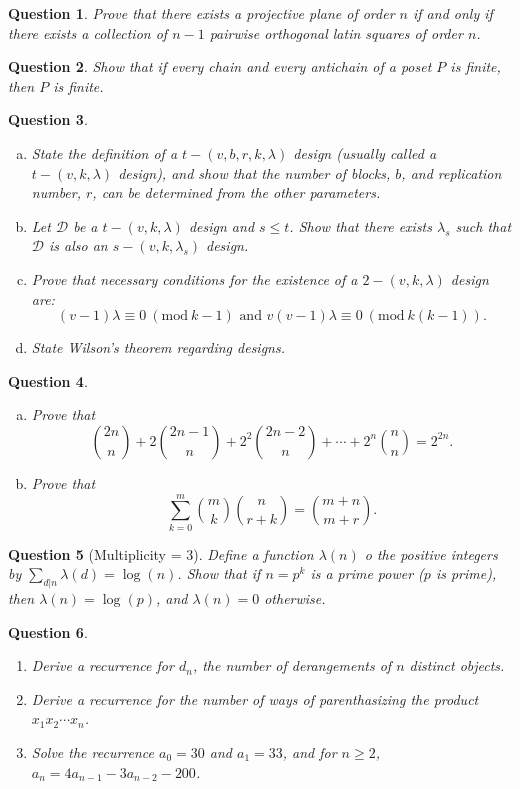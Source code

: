 \documentclass[12]{article}
\newcommand{\Mod}[1]{\ (\mathrm{mod}\ #1)}
\newtheorem{question}{Question}
\theoremstyle{definition}
\begin{document}
	\begin{question}
		Prove that there exists a projective plane of order $n$ if and only if there exists a collection of $n-1$ pairwise orthogonal latin squares of order $n$.
	\end{question}

	\begin{question}
		Show that if every chain and every antichain of a poset $P$ is finite, then $P$ is finite.
	\end{question}

	\begin{question}
		\
		\begin{enumerate}[a)]
			\item State the definition of a $t-(v,b,r,k,\lambda)$ design (usually called a $t-(v,k,\lambda)$ design), and show that the number of blocks, $b$, and replication number, $r$, can be determined from the other parameters.
			\item Let $\mathcal{D}$ be a $t-(v,k,\lambda)$ design and $s \leq t$.  Show that there exists $\lambda_s$ such that $\mathcal{D}$ is also an $s-(v,k,\lambda_s)$ design.
			\item Prove that necessary conditions for the existence of a $2-(v,k,\lambda)$ design are:
			$$(v-1)\lambda \equiv 0 \Mod{k-1} \text{ and } v(v-1)\lambda \equiv 0 \Mod{k(k-1)}.$$
			\item State Wilson's theorem regarding designs.
		\end{enumerate}
	\end{question}

	\begin{question}
		\
		\begin{enumerate}[a)]
			\item Prove that
			$$ {2n \choose n} + 2{2n-1 \choose n} + 2^2{2n - 2 \choose n} + \cdots + 2^n{n \choose n} = 2^{2n}.$$
			\item Prove that
			$$ \sum_{k=0}^m {m \choose k} {n \choose r+k} = {m + n \choose m+r}.$$
		\end{enumerate}
	\end{question}
	
	\begin{question}[Multiplicity = 3]
		Define a function $\lambda(n)$ o the positive integers by $\sum_{d|n} \lambda(d) = \log(n)$.  Show that if $n =  p^k$ is a prime power ($p$ is prime), then $\lambda(n) = \log(p)$, and $\lambda(n) = 0$ otherwise.
	\end{question}
	
	\begin{question}
		\
		\begin{enumerate}
			\item Derive a recurrence for $d_n$, the number of derangements of $n$ distinct objects.
			\item Derive a recurrence for the number of ways of parenthasizing the product $x_1x_2\cdots x_n$.
			\item Solve the recurrence $a_0 = 30$ and $a_1 = 33$, and for $n \geq 2$, $a_n = 4a_{n-1} - 3a_{n-2}-200$.
		\end{enumerate}
	\end{question}
	
	
\end{document}
